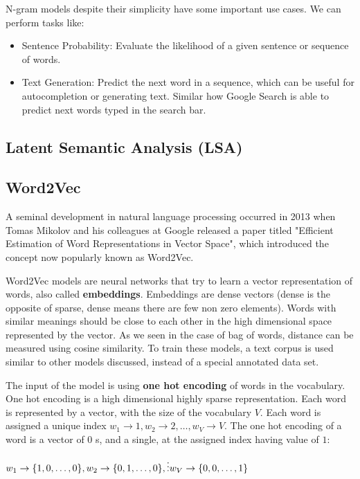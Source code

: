 N-gram models despite their simplicity have some important use cases. We can perform tasks like:

\begin{itemize}
    \item Sentence Probability: Evaluate the likelihood of a given sentence or sequence of words.
    \item Text Generation: Predict the next word in a sequence, which can be useful for autocompletion or generating text. Similar how Google Search is able to predict next words typed in the search bar.
\end{itemize}

\subsection{Latent Semantic Analysis (LSA)}

\subsection{Word2Vec}

A seminal development in natural language processing occurred in 2013 when Tomas Mikolov and his colleagues at Google released a paper titled "Efficient Estimation of Word Representations in Vector Space", which introduced the concept now popularly known as Word2Vec.

Word2Vec models are neural networks that try to learn a vector representation of words, also called \textbf{embeddings}. Embeddings are dense vectors (dense is the opposite of sparse, dense means there are few non zero elements). Words with similar meanings should be close to each other in the high dimensional space represented by the vector. As we seen in the case of bag of words, distance can be measured using cosine similarity. To train these models, a text corpus is used similar to other models discussed, instead of a special annotated data set.

The input of the model is using \textbf{one hot encoding} of words in the vocabulary. One hot encoding is a high dimensional highly sparse representation. Each word is represented by a vector, with the size of the vocabulary \(V\). Each word is assigned a unique index \(w_1 \rightarrow 1, w_2 \rightarrow 2, \ldots, w_{V}  \rightarrow V\). The one hot encoding of a word is a vector of \(0\) s, and a single, at the assigned index having value of \(1\):

\(w_1 \rightarrow \{1, 0, \ldots, 0\}, \\
w_2 \rightarrow \{0, 1, \ldots, 0\}, \\
\vdots \\
w_V \rightarrow \{0, 0, \ldots, 1\}\)

